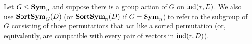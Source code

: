 \documentclass[../paper.tex]{subfiles}
\begin{document}
Let $G \leq \text{\textbf{Sym}}_n$ and suppose there is a group action of $G$ on $\text{\upshape ind}(\tau,
D)$. We also use $\text{\textbf{SortSym}}_G (D)$ (or $\text{\textbf{SortSym}}_n(D)$ if $G = \text{\textbf{Sym}}_n$) to refer
to the subgroup of $G$ consisting of those permutations that act like a sorted
permutation (or, equivalently, are compatible with every pair of vectors in
$\text{\upshape ind}(\tau, D)$).


\end{document}
